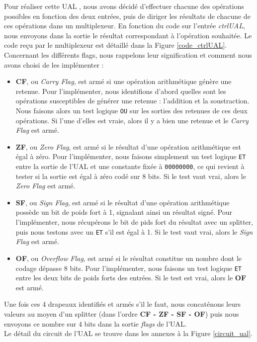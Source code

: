 \documentclass[10pt,a4paper]{article}
\begin{document}
Pour réaliser cette UAL , nous avons décidé d'effectuer chacune des opérations possibles en fonction des deux entrées, puis de diriger les résultats de chacune de ces opérations dans un multiplexeur. En fonction du code sur l'entrée \textit{ctrlUAL}, nous envoyons dans la sortie le résultat correspondant à l'opération souhaitée. Le code reçu par le multiplexeur est détaillé dans la Figure \ref{code_ctrlUAL}. 
Concernant les différents flags, nous rappelons leur signification et comment nous avons choisi de les implémenter :
\begin{itemize}
\item \textbf{CF}, ou \textit{Carry Flag}, est armé si une opération arithmétique génère une retenue. Pour l'implémenter, nous identifions d'abord quelles sont les opérations susceptibles de générer une retenue : l'addition et la soustraction. Nous faisons alors un test logique \verb|OU| sur les sorties des retenues de ces deux opérations. Si l'une d'elles est vraie, alors il y a bien une retenue et le \textit{Carry Flag} est armé.
\item \textbf{ZF}, ou \textit{Zero Flag}, est armé si le résultat d'une opération arithmétique est égal à zéro. Pour l'implémenter, nous faisons simplement un test logique \verb|ET| entre la sortie de l'UAL et une constante fixée à \verb|00000000|, ce qui revient à tester si la sortie est égal à zéro codé sur 8 bits. Si le test vaut vrai, alors le \textit{Zero Flag} est armé.
\item \textbf{SF}, ou \textit{Sign Flag}, est armé si le résultat d'une opération arithmétique possède un bit de poids fort à 1, signalant ainsi un résultat signé. Pour l'implémenter, nous récupérons le bit de pids fort du résultat avec un splitter, puis nous testons avec un \verb|ET| s'il est égal à 1. Si le test vaut vrai, alors le \textit{Sign Flag} est armé.
\item \textbf{OF}, ou \textit{Overflow Flag}, est armé si le résultat constitue un nombre dont le codage dépasse 8 bits. Pour l'implémenter, nous faisons un test logique \verb|ET| entre les deux bits de poids forts des entrées. Si le test est vrai, alors le \textbf{OF} est armé.
\end{itemize} 

Une fois ces 4 drapeaux identifiés et armés s'il le faut, nous concaténons leurs valeurs au moyen d'un splitter (dans l'ordre \textbf{CF - ZF - SF - OF}) puis nous envoyons ce nombre sur 4 bits dans la sortie \textit{flags} de l'UAL. \\
Le détail du circuit de l'UAL se trouve dans les annexes à la Figure \ref{circuit_ual}.
\end{document}
